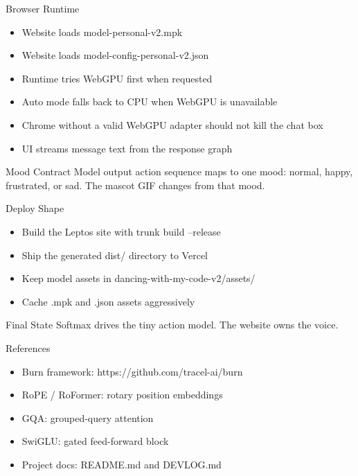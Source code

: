 \documentclass[10pt,aspectratio=169]{beamer}
\newcommand{\code}[1]{{\normalfont\footnotesize #1}}
\begin{document}
\begin{frame}{Browser Runtime}
  \begin{itemize}
    \item Website loads \code{model-personal-v2.mpk}
    \item Website loads \code{model-config-personal-v2.json}
    \item Runtime tries WebGPU first when requested
    \item Auto mode falls back to CPU when WebGPU is unavailable
    \item Chrome without a valid WebGPU adapter should not kill the chat box
    \item UI streams message text from the response graph
  \end{itemize}

  \bigskip
  \begin{block}{Mood Contract}
    Model output action sequence maps to one mood:
    \code{normal}, \code{happy}, \code{frustrated}, or \code{sad}.
    The mascot GIF changes from that mood.
  \end{block}
\end{frame}

\begin{frame}{Deploy Shape}
  \begin{itemize}
    \item Build the Leptos site with \code{trunk build --release}
    \item Ship the generated \code{dist/} directory to Vercel
    \item Keep model assets in \code{dancing-with-my-code-v2/assets/}
    \item Cache \code{.mpk} and \code{.json} assets aggressively
  \end{itemize}

  \bigskip
  \begin{block}{Final State}
    Softmax drives the tiny action model. The website owns the voice.
  \end{block}
\end{frame}

\begin{frame}{References}
  \begin{itemize}
    \item Burn framework: \code{https://github.com/tracel-ai/burn}
    \item RoPE / RoFormer: rotary position embeddings
    \item GQA: grouped-query attention
    \item SwiGLU: gated feed-forward block
    \item Project docs: \code{README.md} and \code{DEVLOG.md}
  \end{itemize}
\end{frame}
\end{document}
